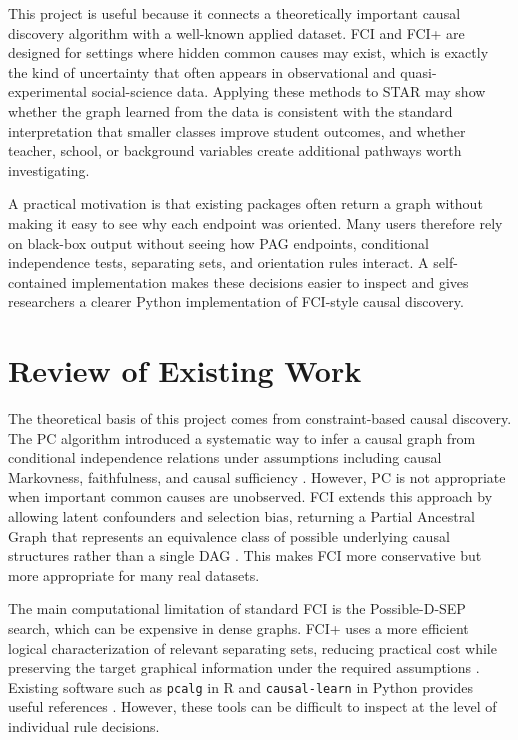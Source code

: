 \documentclass[11pt,a4paper]{article}
\begin{document}
This project is useful because it connects a theoretically important causal discovery algorithm with a well-known applied dataset. FCI and FCI+ are designed for settings where hidden common causes may exist, which is exactly the kind of uncertainty that often appears in observational and quasi-experimental social-science data. Applying these methods to STAR may show whether the graph learned from the data is consistent with the standard interpretation that smaller classes improve student outcomes, and whether teacher, school, or background variables create additional pathways worth investigating.

A practical motivation is that existing packages often return a graph without making it easy to see why each endpoint was oriented. Many users therefore rely on black-box output without seeing how PAG endpoints, conditional independence tests, separating sets, and orientation rules interact. A self-contained implementation makes these decisions easier to inspect and gives researchers a clearer Python implementation of FCI-style causal discovery.

\section*{Review of Existing Work}

The theoretical basis of this project comes from constraint-based causal discovery. The PC algorithm introduced a systematic way to infer a causal graph from conditional independence relations under assumptions including causal Markovness, faithfulness, and causal sufficiency \citep{spirtes2000causation}. However, PC is not appropriate when important common causes are unobserved. FCI extends this approach by allowing latent confounders and selection bias, returning a Partial Ancestral Graph that represents an equivalence class of possible underlying causal structures rather than a single DAG \citep{spirtes2000causation}. This makes FCI more conservative but more appropriate for many real datasets.

The main computational limitation of standard FCI is the Possible-D-SEP search, which can be expensive in dense graphs. FCI+ uses a more efficient logical characterization of relevant separating sets, reducing practical cost while preserving the target graphical information under the required assumptions \citep{claassen2013learning}. Existing software such as \texttt{pcalg} in R and \texttt{causal-learn} in Python provides useful references \citep{kalisch2012causal,zheng2024causal}. However, these tools can be difficult to inspect at the level of individual rule decisions.
\end{document}
